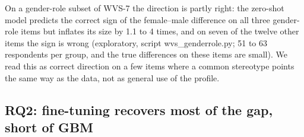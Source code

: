 \documentclass[conference]{IEEEtran}
\begin{document}
On a gender-role subset of WVS-7 the direction is partly right: the zero-shot model predicts the correct sign of the female--male difference on all three gender-role items but inflates its size by 1.1 to 4 times, and on seven of the twelve other items the sign is wrong (exploratory, script wvs\_genderrole.py; 51 to 63 respondents per group, and the true differences on these items are small). We read this as correct direction on a few items where a common stereotype points the same way as the data, not as general use of the profile.

\subsection{RQ2: fine-tuning recovers most of the gap, short of GBM}

\begin{table}[!t]
\caption{Pew fold-0 results, 46{,}209 held-out answers from 6{,}000 respondents. $^\dagger$MAE on ordinal items. $^\S$Error of the predicted subgroup-mean answer on a $[0,1]$ scale (hard predictions).}
\label{tab:pewoverall}
\centering
\footnotesize

\end{table}
\end{document}
